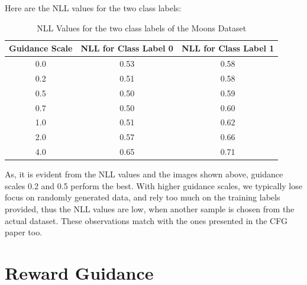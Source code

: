 \documentclass[a4paper,12pt]{article}
\begin{document}
Here are the NLL values for the two class labels:

\begin{table}[h]
  \centering
  \begin{tabular}{|c|c|c|}
      \hline
      {\bf Guidance Scale} & {\bf NLL for Class Label 0} & {\bf NLL for Class Label 1} \\
      \hline
      0.0 & 0.53 & 0.58 \\
      0.2 & 0.51 & 0.58 \\
      0.5 & 0.50 & 0.59 \\
      0.7 & 0.50 & 0.60 \\
      1.0 & 0.51 & 0.62 \\
      2.0 & 0.57 & 0.66 \\
      4.0 & 0.65 & 0.71 \\
      \hline
  \end{tabular}
  \caption{NLL Values for the two class labels of the Moons Dataset}
  \label{tab:nll_values}
\end{table}

As, it is evident from the NLL values and the images shown above, guidance scales 0.2 and 0.5 perform the best. With higher guidance scales, we typically lose focus on randomly generated data, and rely too much on the training labels provided, thus the NLL values are low, when another sample is chosen from the actual dataset. These observations match with the ones presented in the CFG paper too.






\clearpage
\section*{Reward Guidance}
\end{document}
